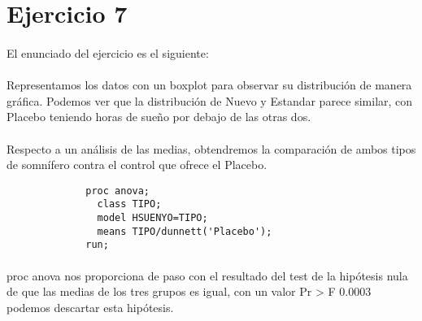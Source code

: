 \documentclass{article}
\begin{document}
  \maketitle

  \section{Ejercicio 7}

    \paragraph{}
    El enunciado del ejercicio es el siguiente: 

    \paragraph{}
    Representamos los datos con un boxplot para observar su distribución de manera gráfica. Podemos ver que la distribución de Nuevo y Estandar parece similar, con Placebo teniendo horas de sueño por debajo de las otras dos.

    \paragraph{}
    Respecto a un análisis de las medias, obtendremos la comparación de ambos tipos de somnífero contra el control que ofrece el Placebo.


    \begin{figure}[h]
			\centering
      \begin{verbatim}
        proc anova;
          class TIPO;
          model HSUENYO=TIPO;
          means TIPO/dunnett('Placebo');
        run;
      \end{verbatim}
			\label{code:sas_1}
		\end{figure}

    \paragraph{}
    proc anova nos proporciona de paso con el resultado del test de la hipótesis nula de que las medias de los tres grupos es igual, con un valor Pr > F 0.0003 podemos descartar esta hipótesis.
\end{document}
